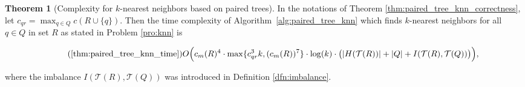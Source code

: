 \documentclass[a4paper,UKenglish,cleveref, autoref]{lipics-v2019}
\numberwithin{algocf}{section}
\theoremstyle{definition}
\newtheorem{thmm}[algocf]{Theorem}
\theoremstyle{definition}
\theoremstyle{definition}
\theoremstyle{plain}
\newcommand{\T}{\mathcal{T}}
\begin{document}
\begin{thmm}[Complexity for $k$-nearest neighbors based on paired trees]
\label{thm:paired_tree_knn_time}
In the notations of Theorem \ref{thm:paired_tree_knn_correctness}, let  $c_{qr} = \max_{q \in Q}c(R \cup \{q\})$. Then the time complexity of Algorithm~\ref{alg:paired_tree_knn} which finds $k$-nearest neighbors for all $q \in Q$ in set $R$ as stated in Problem \ref{pro:knn} is
\begin{ceqn}
\begin{equation}
\tag{\ref{thm:paired_tree_knn_time}}
\label{eqa:ComputationTimeKNN}
 O\Big(c_m(R)^4 \cdot \max\{ c_{qr}^3k ,(c_m(R))^7\}\cdot \log(k)\cdot \big( |H(\T(R))| + |Q| + I(\T(R),\T(Q)) \big) \Big ),
\end{equation}
\end{ceqn}
where the imbalance $I(\T(R),\T(Q))$ was introduced in Definition \ref{dfn:imbalance}.
\end{thmm}
\end{document}
